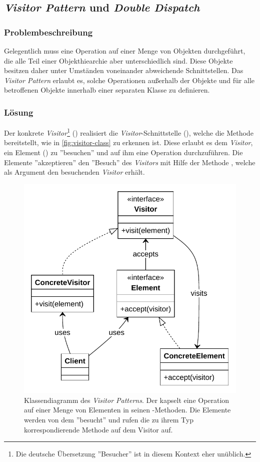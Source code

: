 \subsection{\emph{Visitor Pattern} und \emph{Double Dispatch}}


\subsubsection*{Problembeschreibung}

Gelegentlich muss eine Operation auf einer Menge von Objekten durchgeführt, die alle Teil einer Objekthiearchie aber unterschiedlich sind. Diese Objekte besitzen daher unter Umständen voneinander abweichende Schnittstellen. Das \emph{Visitor Pattern} erlaubt es, solche Operationen außerhalb der Objekte und für alle betroffenen Objekte innerhalb einer separaten Klasse zu definieren. \cite{gamma_design_1995}

\subsubsection*{Lösung}

Der konkrete \emph{Visitor}\footnote{Die deutsche Übersetzung ''Besucher'' ist in diesem Kontext eher unüblich.} () realisiert die \emph{Visitor}-Schnittstelle (), welche die Methode  bereitstellt, wie in \autoref{fig:visitor-class} zu erkennen ist. Diese erlaubt es dem \emph{Visitor}, ein Element () zu ''besuchen'' und auf ihm eine Operation durchzuführen. Die Elemente ''akzeptieren'' den ''Besuch'' des \emph{Visitors} mit Hilfe der Methode , welche als Argument den besuchenden \emph{Visitor} erhält.

\begin{figure}[!ht]
	\centering
	\includegraphics[width=0.75\linewidth]{images/patterns/visitor-class.pdf}
	\caption{Klassendiagramm des \emph{Visitor Patterns}. Der  kapselt eine Operation auf einer Menge von Elementen in seinen -Methoden. Die Elemente werden von dem  ''besucht'' und rufen die zu ihrem Typ korrespondierende Methode auf dem Visitor auf. \cite{skobeleva_visitor_2023}}
	\label{fig:visitor-class}
\end{figure}

